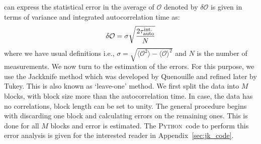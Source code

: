 \documentclass[letter,11pt]{article}
\newcommand{\PY}{\textsc{Python}}
\begin{document}
can express the statistical error in the average of $\mathcal{O}$ denoted 
by $\delta \mathcal{O}$ is given in terms of variance and integrated autocorrelation time as:
\begin{equation}
	\delta \mathcal{O} = \sigma \sqrt{\frac{2 \tau_{\rm{auto}}^{\rm{int.}}}{N}}  %
\end{equation}
where we have usual definitions i.e., 
$\sigma = \sqrt{\langle \mathcal{O}^2\rangle - \langle \mathcal{O}\rangle^{2}}$ and $N$ is the number of measurements. We now turn to the estimation of the errors. For this purpose, we use the Jackknife method which was developed by Quenouille and refined later by Tukey. This is also known as `leave-one' method. We first split the data into $M$ blocks, with block size more than the autocorrelation time. In case, the data has no correlations, block length can be set to unity. The general procedure begins with discarding one block and calculating errors on the remaining ones. This is done for all $M$ blocks and error is estimated. The \PY~code to perform this error analysis is given for the interested reader in Appendix~\ref{sec:jk_code}. 

\end{document}
